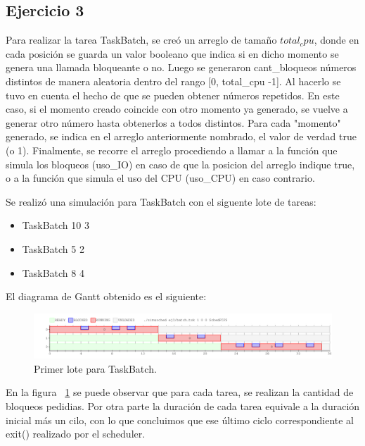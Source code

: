 \subsection{Ejercicio 3}

Para realizar la tarea TaskBatch, se creó un arreglo de tamaño $total_cpu$, donde en cada posición se guarda un valor booleano que indica si en dicho momento se genera una llamada bloqueante o no. Luego se generaron cant_bloqueos números distintos de manera aleatoria dentro del rango [0, total_cpu -1]. Al hacerlo se tuvo en cuenta el hecho de que se pueden obtener números repetidos.
En este caso, si el momento creado coincide con otro momento ya generado, se vuelve a generar otro número hasta obtenerlos a todos distintos. Para cada "momento" generado, se indica en el arreglo anteriormente nombrado, el valor de verdad true (o 1).
Finalmente, se recorre el arreglo procediendo a llamar a la función que simula los bloqueos (uso_IO) en caso de que la posicion del arreglo indique true, o a la función que simula el uso del CPU (uso_CPU) en caso contrario.

Se realizó una simulación para TaskBatch con el siguente lote de tareas:

\begin{itemize}

\item TaskBatch 10 3
\item TaskBatch 5 2
\item TaskBatch 8 4

\end{itemize}

El diagrama de Gantt obtenido es el siguiente:

\begin{figure}[h]
  \includegraphics[width=\textwidth]{../ej3/salida.png}
  \caption{Primer lote para TaskBatch.}
  \label{fig:primera}
\end{figure}


En la figura ~\ref{fig:primera} se puede observar que para cada tarea, se realizan la cantidad de bloqueos pedidias. Por otra parte la duración de cada tarea equivale a la duración inicial más un cilo, con lo que concluimos que ese último ciclo correspondiente al exit() realizado por el scheduler.\\



